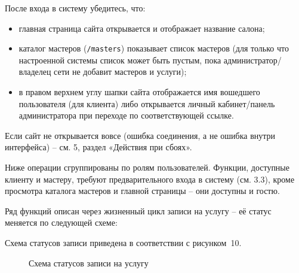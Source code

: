 После входа в систему убедитесь, что:
\begin{itemize}
  \item главная страница сайта открывается и отображает название салона;
  \item каталог мастеров (\texttt{/masters}) показывает список мастеров
        (для только что настроенной системы список может быть пустым,
        пока администратор/владелец сети не добавит мастеров и услуги);
  \item в правом верхнем углу шапки сайта отображается имя вошедшего
        пользователя (для клиента) либо открывается личный кабинет/панель
        администратора при переходе по соответствующей ссылке.
\end{itemize}
Если сайт не открывается вовсе (ошибка соединения, а не ошибка внутри
интерфейса) -- см. 5, раздел «Действия при сбоях».


Ниже операции сгруппированы по ролям пользователей. Функции, доступные
клиенту и мастеру, требуют предварительного входа в систему (см. 3.3),
кроме просмотра каталога мастеров и главной страницы -- они доступны и
гостю.

Ряд функций описан через жизненный цикл записи на услугу -- её статус
меняется по следующей схеме:


Схема статусов записи приведена в соответствии с рисунком~10.
\begin{figure}[H]
\centering
{}
\caption{Схема статусов записи на услугу}
\end{figure}

